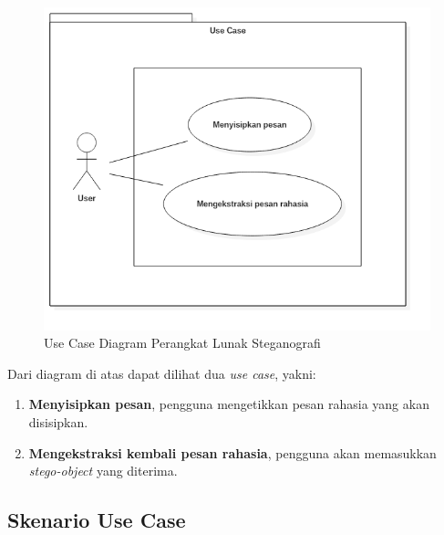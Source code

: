 \begin{figure}[H]
	\centering
	\includegraphics[scale=0.5]{Gambar/usecase}
	\caption{Use Case Diagram Perangkat Lunak Steganografi} 
	\label{fig:3_usecase}
\end{figure}

Dari diagram di atas dapat dilihat dua \textit{use case}, yakni:
\begin{enumerate}
	\item \textbf{Menyisipkan pesan}, pengguna mengetikkan pesan rahasia yang akan disisipkan.
	\item \textbf{Mengekstraksi kembali pesan rahasia}, pengguna akan memasukkan \textit{stego-object} yang diterima.
\end{enumerate}

\subsection{Skenario Use Case}

